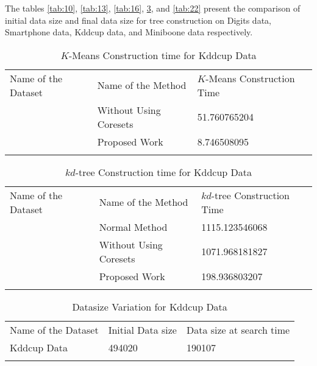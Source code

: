 \documentclass[runningheads]{llncs}
\begin{document}
\clearpage
The tables \ref{tab:10}, \ref{tab:13}, \ref{tab:16}, \ref{tab:19}, and \ref{tab:22} present the comparison of initial data size and final data size for tree construction on Digits data, Smartphone data, Kddcup data, and Miniboone data respectively.


\begin{table}[!hbt]
	\caption{$K$-Means Construction time for Kddcup Data}
	\label{tab:18}       %
	\begin{tabular}{p{3cm}p{4cm}p{3.4cm}}
		\hline\noalign{\smallskip}
		Name of the Dataset & Name of the Method & $K$-Means Construction Time  \\
		\noalign{\smallskip}\hline\noalign{\smallskip}
		\multirow{2}{*}{Kddcup Data} & Without Using Coresets & 51.760765204\\
		& Proposed Work  & 8.746508095\\
		\noalign{\smallskip}\hline\noalign{\smallskip}
	\end{tabular}
\end{table}
\begin{table}[!hbt]
	\caption{$kd$-tree Construction time for Kddcup Data}
	\label{tab:17}       %
	\begin{tabular}{p{3cm}p{4cm}p{3.4cm}}
		\hline\noalign{\smallskip}
		Name of the Dataset & Name of the Method & $kd$-tree Construction Time  \\
		\noalign{\smallskip}\hline\noalign{\smallskip}
		\multirow{3}{*}{Kddcup Data} & Normal Method  & 1115.123546068\\
		& Without Using Coresets & 1071.968181827\\
		& Proposed Work  & 198.936803207\\
		\noalign{\smallskip}\hline\noalign{\smallskip}
	\end{tabular}
\end{table}	
\begin{table}[!hbt]
	\caption{Datasize Variation for Kddcup Data}
	\label{tab:19}       %
	\begin{tabular}{p{3cm}p{4cm}p{3.4cm}}
		\hline\noalign{\smallskip}
		Name of the Dataset & Initial Data size & Data size at search time  \\
		\noalign{\smallskip}\hline\noalign{\smallskip}
		Kddcup Data& 494020  & 190107 \\
		\noalign{\smallskip}\hline\noalign{\smallskip}
	\end{tabular}
\end{table}
\end{document}
